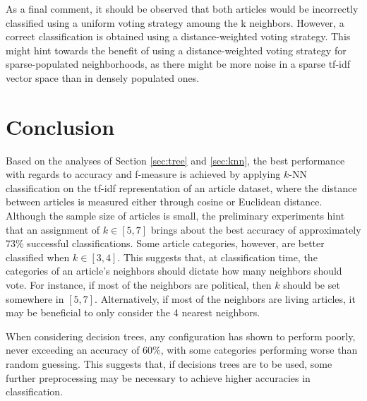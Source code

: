 \documentclass[11pt]{article}
\begin{document}
As a final comment, it should be observed that both articles would be incorrectly classified using a uniform voting strategy amoung the k neighbors.
However, a correct classification is obtained using a distance-weighted voting strategy.
This might hint towards the benefit of using a distance-weighted voting strategy for sparse-populated neighborhoods, as there might be more noise in a sparse tf-idf vector space than in densely populated ones.

\section{Conclusion}

Based on the analyses of Section \ref{sec:tree} and \ref{sec:knn}, the best performance with regards to accuracy and f-measure is achieved by applying $k$-NN classification on the tf-idf representation of an article dataset, where the distance between articles is measured either through cosine or Euclidean distance.
Although the sample size of articles is small, the preliminary experiments hint that an assignment of $k \in [ 5, 7 ]$ brings about the best accuracy of approximately 73\% successful classifications.
Some article categories, however, are better classified when $k \in [3,4]$.
This suggests that, at classification time, the categories of an article's neighbors should dictate how many neighbors should vote.
For instance, if most of the neighbors are political, then $k$ should be set somewhere in $[5,7]$.
Alternatively, if most of the neighbors are living articles, it may be beneficial to only consider the 4 nearest neighbors.

When considering decision trees, any configuration has shown to perform poorly, never exceeding an accuracy of 60\%, with some categories performing worse than random guessing.
This suggests that, if decisions trees are to be used, some further preprocessing may be necessary to achieve higher accuracies in classification.

{}

\end{document}
